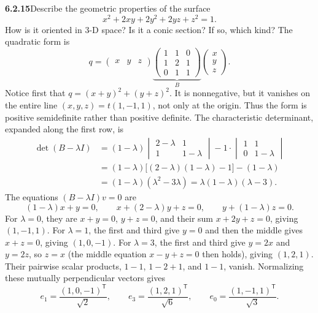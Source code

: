 \par\bigskip
\noindent\textbf{6.2.15}\quad Describe the geometric properties of the
surface
\[
x^{2}+2xy+2y^{2}+2yz+z^{2}=1.
\]
How is it oriented in 3-D space? Is it a conic section? If so, which kind?
\solution
The quadratic form is
\[
q=\begin{pmatrix}x&y&z\end{pmatrix}
\underbrace{\begin{pmatrix}1&1&0\\1&2&1\\0&1&1\end{pmatrix}}_{B}
\begin{pmatrix}x\\y\\z\end{pmatrix}.
\]
Notice first that $q=(x+y)^2+(y+z)^2$. It is nonnegative, but it vanishes
on the entire line $(x,y,z)=t(1,-1,1)$, not only at the origin.
Thus the form is positive semidefinite rather than positive definite.
The characteristic determinant, expanded along the first row, is
\begin{align*}
\det(B-\lambda I)
&=(1-\lambda)\begin{vmatrix}2-\lambda&1\\1&1-\lambda\end{vmatrix}
-1\cdot\begin{vmatrix}1&1\\0&1-\lambda\end{vmatrix}\\
&=(1-\lambda)\bigl[(2-\lambda)(1-\lambda)-1\bigr]-(1-\lambda)\\
&=(1-\lambda)(\lambda^2-3\lambda)
=\lambda(1-\lambda)(\lambda-3).
\end{align*}
The equations $(B-\lambda I)v=0$ are
\[
(1-\lambda)x+y=0,\qquad x+(2-\lambda)y+z=0,\qquad y+(1-\lambda)z=0.
\]
For $\lambda=0$, they are $x+y=0$, $y+z=0$, and their sum
$x+2y+z=0$, giving $(1,-1,1)$. For $\lambda=1$, the first and third
give $y=0$ and then the middle gives $x+z=0$, giving $(1,0,-1)$.
For $\lambda=3$, the first and third give $y=2x$ and $y=2z$, so $z=x$
(the middle equation $x-y+z=0$ then holds), giving $(1,2,1)$.
Their pairwise scalar products, $1-1$, $1-2+1$, and $1-1$, vanish.
Normalizing these mutually perpendicular vectors gives
\[
e_1=\frac{(1,0,-1)^{\mathsf T}}{\sqrt2},\qquad
e_3=\frac{(1,2,1)^{\mathsf T}}{\sqrt6},\qquad
e_0=\frac{(1,-1,1)^{\mathsf T}}{\sqrt3}.
\]

